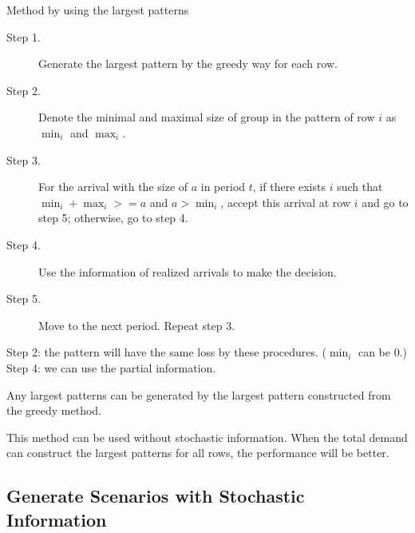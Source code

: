 




\begin{algorithm}[H]\label{algo_largest}
  \caption{Method by using the largest patterns}
  \begin{description}
    \item[Step 1.] Generate the largest pattern by the greedy way for each row.
    \item[Step 2.] Denote the minimal and maximal size of group in the pattern of row $i$ as $\min_i$ and $\max_i$. 
    \item[Step 3.] For the arrival with the size of $a$ in period $t$, if there exists $i$ such that $\min_i + \max_i >= a$ and $a > \min_i$, accept this arrival at row $i$ and go to step 5; otherwise, go to step 4.
    \item[Step 4.] Use the information of realized arrivals to make the decision.
    \item[Step 5.] Move to the next period. Repeat step 3. 
  \end{description}
\end{algorithm}

Step 2: the pattern will have the same loss by these procedures. ($\min_i$ can be 0.)
Step 4: we can use the partial information.

\begin{lem}
  Any largest patterns can be generated by the largest pattern constructed from the greedy method.
\end{lem}

This method can be used without stochastic information. When the total demand can construct the largest patterns for all rows, the performance will be better.


\subsection{Generate Scenarios with Stochastic Information}\label{MappingSeq}

